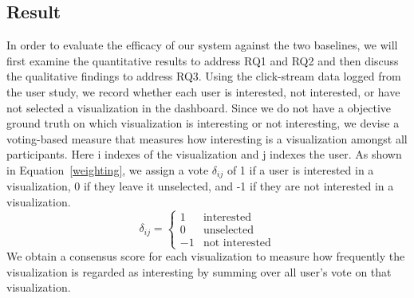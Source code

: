 \subsection{Result}
In order to evaluate the efficacy of our system against the two baselines, we will first examine the quantitative results to address RQ1 and RQ2 and then discuss the qualitative findings to address RQ3.
 Using the click-stream data logged from the user study, we record whether each user is interested, not interested, or have not selected a visualization in the dashboard. %
Since we do not have a objective ground truth on which visualization is interesting or not interesting, we devise a voting-based measure that measures how interesting is a visualization amongst all participants. Here i indexes of the visualization and j indexes the user. As shown in Equation~\ref{weighting}, we assign a vote $\delta_{ij}$ of 1 if a user is interested in a visualization, 0 if they leave it unselected, and -1 if they are not interested in a visualization.
\begin{equation}\label{weighting}
	\delta_{ij}= \left\{\begin{matrix}
	 1& \textrm{interested}
	\\ 0 & \textrm{unselected}
	\\ -1 & \textrm{not interested}
	\end{matrix}\right.
\end{equation}
We obtain a consensus score for each visualization to measure how frequently the visualization is regarded as interesting by summing over all user's vote on that visualization.
